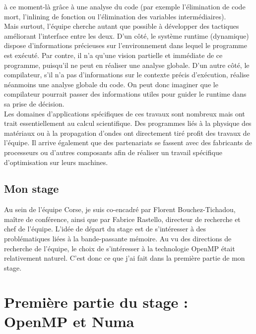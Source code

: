 \documentclass{report}
\begin{document}
à ce moment-là grâce à une analyse du code (par exemple l'élimination de code mort, l'inlining de fonction
ou l'élimination des variables intermédiaires).
\\Mais surtout, l'équipe cherche autant que possible à développer des tactiques améliorant l'interface
entre les deux. D'un côté, le système runtime (dynamique) dispose d'informations précieuses sur 
l'environnement dans lequel le programme est exécuté. Par contre, il n'a qu'une vision partielle et 
immédiate de ce programme, puisqu'il ne peut en réaliser une analyse globale. D'un autre côté, le 
compilateur, s'il n'a pas d'informations sur le contexte précis d'exécution, réalise néanmoins une
analyse globale du code. On peut donc imaginer que le compilateur pourrait passer des informations 
utiles pour guider le runtime dans sa prise de décision.
\\Les domaines d'applications spécifiques de ces travaux sont nombreux mais ont trait essentiellement
au calcul scientifique. Des programmes liés à la physique des matériaux ou à la propagation d'ondes
ont directement tiré profit des travaux de l'équipe. Il arrive également que des partenariats se
fassent avec des fabricants de processeurs ou d'autres composants afin de réaliser un travail spécifique
d'optimisation sur leurs machines.
\section{Mon stage}
Au sein de l'équipe Corse, je suis co-encadré par Florent Bouchez-Tichadou, maître de conférence, ainsi
que par Fabrice Rastello, directeur de recherche et chef de l'équipe. L'idée de départ du stage est de 
s'intéresser à des problématiques liées à la bande-passante mémoire. Au vu des directions de recherche
de l'équipe, le choix de s'intéresser à la technologie OpenMP était relativement naturel. C'est donc
 ce que j'ai fait dans la première partie de mon stage.
\chapter{Première partie du stage : OpenMP et Numa}
\end{document}
